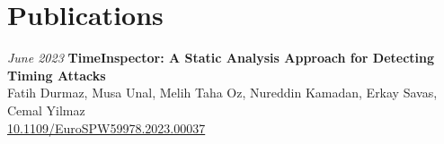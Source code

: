 \section{Publications}

\begin{twocolentry}{
    \textit{June 2023}}
    \textbf{TimeInspector: A Static Analysis Approach for Detecting Timing Attacks}\\
    \small Fatih Durmaz, Musa Unal, Melih Taha Oz, Nureddin Kamadan, Erkay Savas, Cemal Yilmaz\\
    \small \href{https://doi.org/10.1109/EuroSPW59978.2023.00037}{10.1109/EuroSPW59978.2023.00037}
\end{twocolentry}
